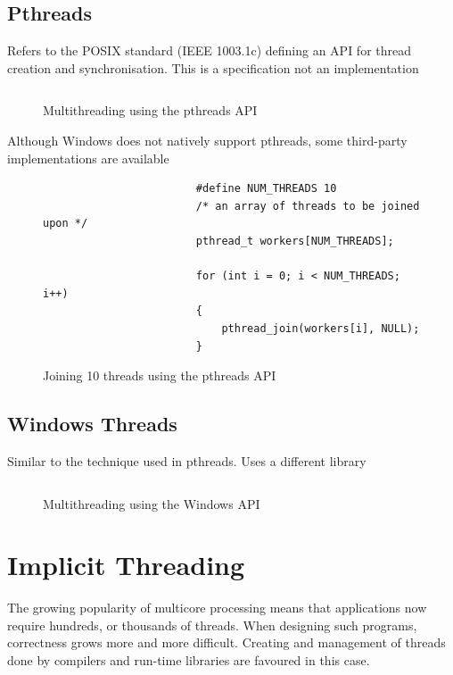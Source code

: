 \documentclass{book/custombook}
\begin{document}
            \subsection{Pthreads}
                Refers to the POSIX standard (IEEE 1003.1c) defining an API for thread creation and synchronisation.
                This is a specification not an implementation
                \begin{figure}[H]
                    \centering
                    \inputminted{c}{code/threads/pthreads.c}
                    \caption{Multithreading using the pthreads API}
                \end{figure}
                Although Windows does not natively support pthreads, some third-party implementations are available
                \begin{figure}[H]
                    \centering
                    \begin{verbatim}
                        #define NUM_THREADS 10
                        /* an array of threads to be joined upon */
                        pthread_t workers[NUM_THREADS];

                        for (int i = 0; i < NUM_THREADS; i++)
                        {
                            pthread_join(workers[i], NULL);
                        }
                    \end{verbatim}
                    \caption{Joining 10 threads using the pthreads API}
                \end{figure}
            \subsection{Windows Threads}
                Similar to the technique used in pthreads. Uses a different library
                \begin{figure}[H]
                    \centering
                    \inputminted{c}{code/threads/windows_threads.c}
                    \caption{Multithreading using the Windows API}
                \end{figure}
        \section{Implicit Threading}
            The growing popularity of multicore processing means that applications now require hundreds,
            or thousands of threads. When designing such programs, correctness grows more and more difficult.
            Creating and management of threads done by compilers and run-time libraries are favoured in this case.
\end{document}
